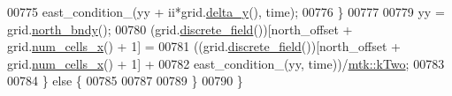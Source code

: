 \begin{DoxyCode}
00775         east\_condition\_(yy + ii*grid.\hyperlink{classmtk_1_1UniStgGrid2D_a65a78cfc80ffdbeb282ed57af4dc5cb4}{delta\_y}(), time);
00776     \}
00777 
00779     yy = grid.\hyperlink{classmtk_1_1UniStgGrid2D_afe1ead253cdeb5503e0489eba8fd84e2}{north\_bndy}();
00780     (grid.\hyperlink{classmtk_1_1UniStgGrid2D_a3e72d59843a3f9c5e47da07e5850dfe0}{discrete\_field}())[north\_offset + grid.\hyperlink{classmtk_1_1UniStgGrid2D_a2d182866a398aba8e4829590e85bf939}{num\_cells\_x}() + 1] =
00781       ((grid.\hyperlink{classmtk_1_1UniStgGrid2D_a3e72d59843a3f9c5e47da07e5850dfe0}{discrete\_field}())[north\_offset + grid.\hyperlink{classmtk_1_1UniStgGrid2D_a2d182866a398aba8e4829590e85bf939}{num\_cells\_x}() + 1] +
00782       east\_condition\_(yy, time))/\hyperlink{group__c01-roots_gaf39c2d851a2db744f4feb1c5ab3ec2cf}{mtk::kTwo};
00783 
00784   \} \textcolor{keywordflow}{else} \{
00785 
00787 
00789   \}
00790 \}
\end{DoxyCode}
